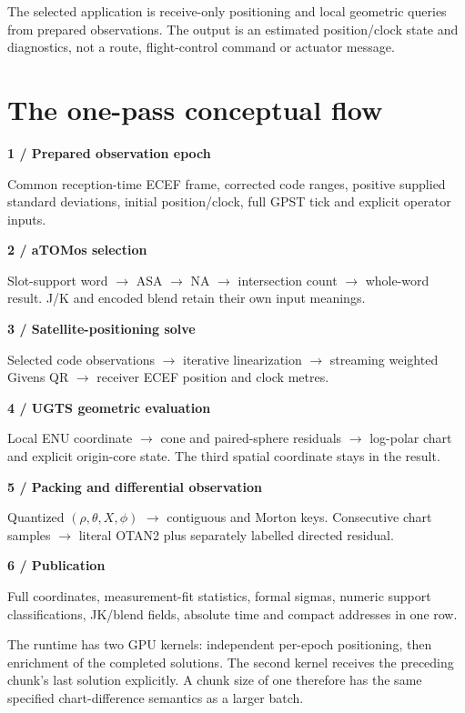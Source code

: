 \documentclass[11pt,a4paper]{article}
\begin{document}
The selected application is receive-only positioning and local geometric queries from prepared observations.
The output is an estimated position/clock state and diagnostics, not a route, flight-control command or actuator message.
\clearpage

\section*{The one-pass conceptual flow}
\begin{panel}
\textbf{1 / Prepared observation epoch}\par
Common reception-time ECEF frame, corrected code ranges, positive supplied standard deviations,
initial position/clock, full GPST tick and explicit operator inputs.\par
\textbf{2 / aTOMos selection}\par
Slot-support word $\to$ ASA $\to$ NA $\to$ intersection count $\to$ whole-word result.
J/K and encoded blend retain their own input meanings.\par
\textbf{3 / Satellite-positioning solve}\par
Selected code observations $\to$ iterative linearization $\to$ streaming weighted Givens QR
$\to$ receiver ECEF position and clock metres.\par
\textbf{4 / UGTS geometric evaluation}\par
Local ENU coordinate $\to$ cone and paired-sphere residuals $\to$ log-polar chart and explicit origin-core state.
The third spatial coordinate stays in the result.\par
\textbf{5 / Packing and differential observation}\par
Quantized $(\rho,\theta,X,\phi)$ $\to$ contiguous and Morton keys.
Consecutive chart samples $\to$ literal OTAN2 plus separately labelled directed residual.\par
\textbf{6 / Publication}\par
Full coordinates, measurement-fit statistics, formal sigmas, numeric support classifications,
JK/blend fields, absolute time and compact addresses in one row.
\end{panel}

The runtime has two GPU kernels: independent per-epoch positioning, then enrichment of the completed solutions.
The second kernel receives the preceding chunk's last solution explicitly. A chunk size of one therefore has
the same specified chart-difference semantics as a larger batch.
\end{document}
